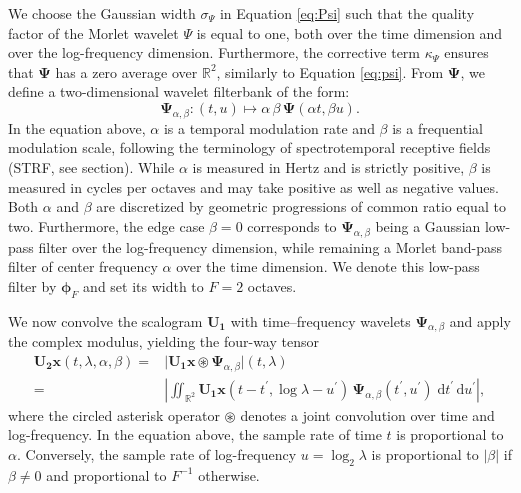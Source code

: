 \documentclass{bmcart}
\newcommand{\lnameref}[1]{%
\bgroup
\let\nmu\MakeLowercase
\nameref{#1}\egroup}
\newcommand{\nmu}{}
\begin{document}
We choose the Gaussian width $\sigma_{\Psi}$ in Equation \ref{eq:Psi} such that the quality factor of the Morlet wavelet $\Psi$ is equal to one, both over the time dimension and over the log-frequency dimension.
Furthermore, the corrective term $\kappa_{\Psi}$ ensures that $\boldsymbol{\Psi}$ has a zero average over $\mathbb{R}^2$, similarly to Equation \ref{eq:psi}.
From $\mathbf{\Psi}$, we define a two-dimensional wavelet filterbank of the form:
\begin{equation}
\mathbf{\Psi}_{\alpha,\beta} : (t, u) \longmapsto
\alpha \, \beta \, \mathbf{\Psi}(\alpha t, \beta u).
\end{equation}
In the equation above, $\alpha$ is a temporal modulation rate and $\beta$ is a frequential modulation scale, following the terminology of spectrotemporal receptive fields (STRF, see \lnameref{sec:related-work} section).
While $\alpha$ is measured in Hertz and is strictly positive, $\beta$ is measured in cycles per octaves and may take positive as well as negative values.
Both $\alpha$ and $\beta$ are discretized by geometric progressions of common ratio equal to two.
Furthermore, the edge case $\beta=0$ corresponds to $\mathbf{\Psi}_{\alpha,\beta}$ being a Gaussian low-pass filter over the log-frequency dimension, while remaining a Morlet band-pass filter of center frequency $\alpha$ over the time dimension.
We denote this low-pass filter by $\boldsymbol{\phi}_F$ and set its width to $F=2$ octaves.

We now convolve the scalogram $\mathbf{U_1}$ with time--frequency wavelets $\mathbf{\Psi}_{\alpha,\beta}$ and apply the complex modulus, yielding the four-way tensor
\begin{align}
\mathbf{U_2}\boldsymbol{x} (t, \lambda, \alpha, \beta)
=&
\big \vert
\mathbf{U_1}\boldsymbol{x} \circledast \boldsymbol{\Psi}_{\alpha,\beta}
\big \vert (t, \lambda)
\nonumber \\
=&
\left\vert
\iint_{\mathbb{R}^2}
\mathbf{U_1}\boldsymbol{x}(t - t^\prime, \log \lambda - u^\prime)\,
\boldsymbol{\Psi}_{\alpha,\beta}(t^\prime, u^\prime)\;
\mathrm{d}t^\prime \, \mathrm{d}u^\prime
\right\vert,
\label{eq:U2}
\end{align}
where the circled asterisk operator $\circledast$ denotes a joint convolution over time and log-frequency.
In the equation above, the sample rate of time $t$ is proportional to $\alpha$.
Conversely, the sample rate of log-frequency $u = \log_2 \lambda$ is proportional to $\vert\beta\vert$ if $\beta \neq 0$ and proportional to $F^{-1}$ otherwise.
\end{document}
